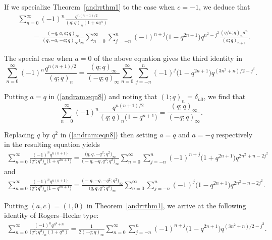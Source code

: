 \documentclass[pdftex]{sigma}
\numberwithin{equation}{section}
\begin{document}
If we specialize Theorem~\ref{andrrthm1} to the case when $c=-1$, we deduce that
\begin{align}
	&\sum_{n=0}^\infty (-1)^n \frac{q^{n(n+1)/2}}{(q; q)_n (1+aq^n)}\nonumber\\
	&\qquad{}=\frac{(-q, a, a; q)_\infty}{(q, -a, -a; q)_\infty)_\infty}\sum_{n=0}^\infty \sum_{j=-n}^n (-1)^{n+j} \bigl(1-q^{2n+1}\bigr) q^{n^2-j^2} \frac{(q/a; q)_n a^n}{(a; q)_{n+1}}.\label{andram:eqn8}
\end{align}

The special case when $a=0$ of the above equation gives the third identity in \cite[Proposition~1.11]{Liu2013IJTN}
\begin{equation*}%
	\sum_{n=0}^\infty (-1)^n\frac{q^{n(n+1)/2}}{(q; q)_n}
	=\frac{(q; q)_\infty}{(-q; q)_\infty}\sum_{n=0}^\infty \sum_{j=-n}^n (-1)^{j} \bigl(1-q^{2n+1}\bigr) q^{(3n^2+n)/2-j^2}.
\end{equation*}

Putting $a=q$ in (\ref{andram:eqn8}) and noting that $(1; q)_n=\delta_{n0}$, we find that
\begin{equation*}%
\sum_{n=0}^\infty (-1)^n \frac{q^{n(n+1)/2}}{(q; q)_n \bigl(1+q^{n+1}\bigr)}
=\frac{(q; q)_\infty}{(-q; q)_\infty}.
\end{equation*}

Replacing $q$ by $q^2$ in (\ref{andram:eqn8}) then setting $a=q$ and $a=-q$ respectively in the resulting equation yields
\begin{align*}%
	\sum_{n=0}^\infty \frac{(-1)^n q^{n(n+1)}}{\bigl(q^2; q^2\bigr)_n \bigl(1+q^{2n+1}\bigr)}
	=\frac{\bigl(q, q, -q^2; q^2\bigr)_\infty}{\bigl(-q, -q, q^2; q^2\bigr)_\infty}\sum_{n=0}^\infty \sum_{j=-n}^n (-1)^{n+j} \bigl(1+q^{2n+1}\bigr) q^{2n^2+n-2j^2}
\end{align*}
and
\begin{align*}%
\sum_{n=0}^\infty \frac{(-1)^n q^{n(n+1)}}{\bigl(q^2; q^2\bigr)_n \bigl(1-q^{2n+1}\bigr)}
=\frac{\bigl(-q, -q, -q^2; q^2\bigr)_\infty}{\bigl(q, q, q^2; q^2\bigr)_\infty}\sum_{n=0}^\infty \sum_{j=-n}^n (-1)^{j} \bigl(1-q^{2n+1}\bigr) q^{2n^2+n-2j^2}.
\end{align*}

Putting $(a, c)=(1, 0)$ in Theorem~\ref{andrrthm1}, we arrive at the following identity of Rogers--Hecke type:
\begin{align*}%
	\sum_{n=0}^\infty \frac{(-1)^n q^{n^2+n}}{\bigl(q^2; q^2\bigr)_n (1+q^n)}
	=\frac{1}{2(-q; q)_\infty}
	\sum_{n=0}^\infty \sum_{j=-n}^n(-1)^{n+j} \bigl(1-q^{2n+1}\bigr) q^{(3n^2+n)/2-j^2}.
\end{align*}
\end{document}
